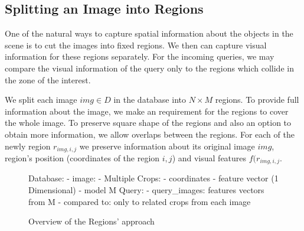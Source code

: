 \subsection{Splitting an Image into Regions}






One of the natural ways to capture spatial information about the objects in the scene is to cut the images into fixed regions. We then can capture visual information for these regions separately. For the incoming queries, we may compare the visual information of the query only to the regions which collide in the zone of the interest.

We split each image  $img \in D$ in the database into $N \times M$ regions. To provide full information about the image, we make an requirement for the regions to cover the whole image. To preserve square shape of the regions and also an option to obtain more information, we allow overlaps between the regions. For each of the newly region $r_{img, i, j}$ we preserve information about its original image $img$, region’s position (coordinates of the region $i, j$) and visual features $f(r_{img, i,j}$.

\begin{figure}
\centering
\begin{boxedverbatim}
Database:
    - image:
        - Multiple Crops:
            - coordinates
            - feature vector (1 Dimensional)
    - model M
Query:
    - query_images: features vectors from M
    - compared to: only to related crops from each image
\end{boxedverbatim}
\caption{Overview of the Regions' approach}
\end{figure}



